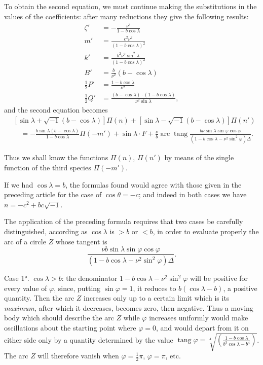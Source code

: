 \documentclass{article}
\begin{document}
To obtain the second equation, we must continue making the substitutions in the values of the coefficients: after many reductions they give the following results:
\[ \begin{aligned} \zeta'&=-\frac{\nu^{2}}{1-b\cos\lambda}\\ m'&=\frac{c^{2}\nu^{2}}{(1-b\cos\lambda)^{2}}\\ k'&=\frac{b^{2}\nu^{2}\sin^{2}\lambda}{(1-b\cos\lambda)^{2}}\\ B'&=\frac{b}{\nu^{2}}(b-\cos\lambda)\\ \tfrac{1}{2}P'&=\frac{1-b\cos\lambda}{\nu^{2}}\\ \tfrac{1}{2}Q'&=\frac{(b-\cos\lambda)\cdot(1-b\cos\lambda)}{\nu^{2}\sin\lambda}, \end{aligned} \]
and the second equation becomes
\[ \begin{aligned} &[\sin\lambda+\sqrt{-1}(b-\cos\lambda)]\Pi(n)+[\sin\lambda-\sqrt{-1}(b-\cos\lambda)]\Pi(n')\\ &\quad=-\frac{b\sin\lambda(b-\cos\lambda)}{1-b\cos\lambda}\Pi(-m')+\sin\lambda\cdot F+\frac{\nu}{b}\operatorname{arc}\operatorname{tang}\frac{b\nu\sin\lambda\sin\varphi\cos\varphi}{(1-b\cos\lambda-\nu^{2}\sin^{2}\varphi)\Delta}. \end{aligned} \]

Thus we shall know the functions $\Pi(n)$, $\Pi(n')$ by means of the single function of the third species $\Pi(-m')$.

If we had $\cos\lambda=b$, the formulas found would agree with those given in the preceding article for the case of $\cos\theta=-c$; and indeed in both cases we have $n=-c^{2}+bc\sqrt{-1}$.

The application of the preceding formula requires that two cases be carefully distinguished, according as $\cos\lambda$ is $>b$ or $<b$, in order to evaluate properly the arc of a circle $Z$ whose tangent is
\[ \frac{\nu b\sin\lambda\sin\varphi\cos\varphi}{(1-b\cos\lambda-\nu^{2}\sin^{2}\varphi)\Delta}. \]

Case 1°. $\cos\lambda>b$: the denominator $1-b\cos\lambda-\nu^{2}\sin^{2}\varphi$ will be positive for every value of $\varphi$, since, putting $\sin\varphi=1$, it reduces to $b(\cos\lambda-b)$, a positive quantity. Then the arc $Z$ increases only up to a certain limit which is its \emph{maximum}, after which it decreases, becomes zero, then negative. Thus a moving body which should describe the arc $Z$ while $\varphi$ increases uniformly would make oscillations about the starting point where $\varphi=0$, and would depart from it on either side only by a quantity determined by the value $\operatorname{tang}\varphi=\sqrt[4]{\left(\frac{1-b\cos\lambda}{b^{3}\cos\lambda-b^{4}}\right)}$. The arc $Z$ will therefore vanish when $\varphi=\frac{1}{2}\pi$, $\varphi=\pi$, etc.
\end{document}
